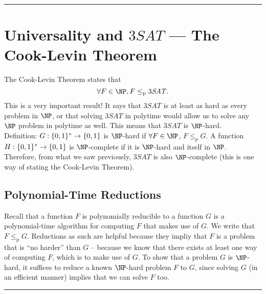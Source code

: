 \documentclass[10pt]{article}
\newcommand{\Line}{\vspace{.3cm}\hrule\vspace{.3cm}}
\newcommand{\TSAT}{3\mathit{SAT}}
\begin{document}
\Line
\section{Universality and $\TSAT$ --- The Cook-Levin Theorem}
The Cook-Levin Theorem states that \[\forall F\in\NP, F\leq_\text{p}\TSAT.\] This is a very important result! It says that $\TSAT$ is at least as hard as every problem in $\NP$, or that solving $\TSAT$ in polytime would allow us to solve any $\NP$ problem in polytime as well. This means that $\TSAT$ is $\NP$-hard.\\

Definition: $G:\{0,1\}^*\to\{0,1\}$ is $\NP$-hard if $\forall F\in \NP$, $F\leq_p G$. A function $H:\{0,1\}^*\to\{0,1\}$ is $\NP$-complete if it is $\NP$-hard and itself in $\NP$.\\

Therefore, from what we saw previously, $\TSAT$ is also $\NP$-complete (this is one way of stating the Cook-Levin Theorem).

\subsection{Polynomial-Time Reductions}

Recall that a function $F$ is polynomially reducible to a function $G$ is a polynomial-time algorithm for computing $F$ that makes use of $G$. We write that $F\leq_\text{p} G$. Reductions as such are helpful because they impliy that $F$ is a problem that is ``no harder'' than $G$ -- because we know that there exists at least one way of computing $F$, which is to make use of $G$. To show that a problem $G$ is $\NP$-hard, it suffices to reduce a known $\NP$-hard problem $F$ to $G$, since solving $G$ (in an efficient manner) implies that we can solve $F$ too.\\

\Line
\end{document}
